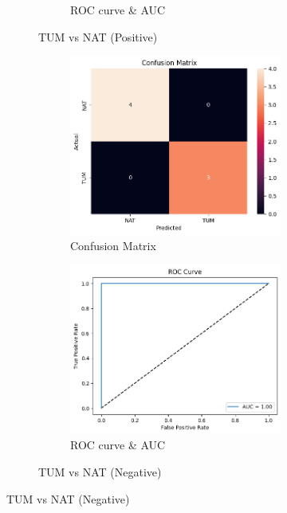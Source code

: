 \documentclass[a4paper,12pt]{article}
\begin{document}
\begin{figure}[H]
\begin{subfigure}[b]{0.45\textwidth}
\begin{subfigure}[b]{0.49\textwidth}
			\caption{ROC curve \& AUC}
			\label{fig:fig2}
		\end{subfigure}
		\caption{TUM vs NAT (Positive)}
		\label{subfig:1}
	\end{subfigure}
	\hfill
	\begin{subfigure}[b]{0.45\textwidth}
		\centering
		\begin{subfigure}[b]{0.49\textwidth}
			\centering
			\includegraphics[width=\textwidth]{images/2nsl1c.png}  %
			\caption{Confusion Matrix}
			\label{fig:fig3}
		\end{subfigure}
		\hfill
		\begin{subfigure}[b]{0.49\textwidth}
			\centering
			\includegraphics[width=\textwidth]{images/2nsl1r.png}  %
			\caption{ROC curve \& AUC}
			\label{fig:fig4}
		\end{subfigure}
		\caption{TUM vs NAT (Negative)}
		\label{subfig:2}
	\end{subfigure}


\end{figure}
\end{document}
